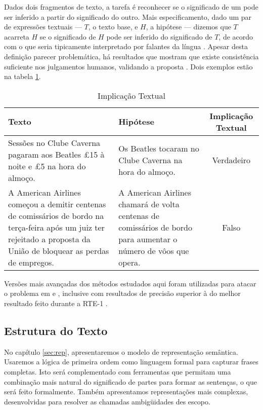 	Dados dois fragmentos de texto, a tarefa é reconhecer se o significado de um pode ser inferido a partir do significado do outro. Mais especificamento, dado um par de expressões textuais --- $T$, o texto base, e $H$, a hipótese --- dizemos que $T$ acarreta $H$ se o significado de $H$ pode ser inferido do significado de $T$, de acordo com o que seria tipicamente interpretado por falantes da língua \citep[p.~1]{TextEnt}. Apesar desta definição parecer problemática, há resultados que mostram que existe consistência suficiente nos julgamentos humanos, validando a proposta \citep[p.~3]{TextEntBook}. Dois exemplos estão na tabela \ref{table:textent}. 
	
	\begin{table}
	\begin{center}
	\begin{tabular}{|p{5cm}|p{5cm}|c|}
	\hline Texto & Hipótese & Implicação Textual \\ 
	\hline  Sessões no Clube Caverna pagaram aos Beatles £15 à noite e £5 na hora do almoço. & Os Beatles tocaram no Clube Caverna na hora do almoço. & Verdadeiro \\ 
	\hline A American Airlines começou a demitir centenas de comissários de bordo na terça-feira após um juiz ter rejeitado a proposta da União de bloquear as perdas de empregos. & A American Airlines chamará de volta centenas de comissários de bordo para aumentar o número de vôos que opera. &  Falso \\
	\hline
	\end{tabular} 
	\end{center}
	\caption{Implicação Textual}
	\label{table:textent}
	\end{table}
	
	Versões mais avançadas dos métodos estudados aqui foram utilizadas para atacar o problema em \citet{BosMarkert2005} e \citet{BosMarkert2006}, inclusive com resultados de precisão superior à do melhor resultado feito durante a RTE-1 \citep[p.~89]{TextEntBook}.

\subsection{Estrutura do Texto} 

No capítulo \ref{sec:rep}, apresentaremos o modelo de representação semântica. Usaremos a lógica de primeira ordem como linguagem formal para capturar frases completas. Isto será complementado com ferramentas que permitam uma combinação mais natural do significado de partes para formar as sentenças, o que será feito formalmente. Também apresentamos representações mais complexas, desenvolvidas para resolver as chamadas ambigüidades des escopo.


